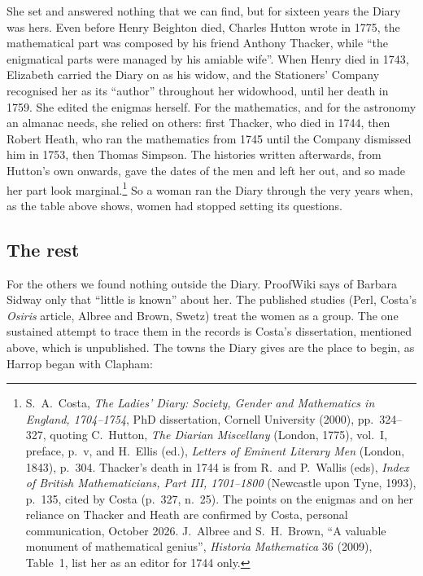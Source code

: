 \documentclass[11pt,a4paper]{article}
\begin{document}
She set and answered nothing that we can find, but for sixteen years the Diary was hers.
Even before Henry Beighton died, Charles Hutton wrote in 1775, the mathematical part was
composed by his friend Anthony Thacker, while ``the enigmatical parts were managed by his
amiable wife''. When Henry died in 1743, Elizabeth carried the Diary on as his widow, and
the Stationers' Company recognised her as its ``author'' throughout her widowhood, until
her death in 1759. She edited the enigmas herself. For the mathematics, and for the
astronomy an almanac needs, she relied on others: first Thacker, who died in 1744, then
Robert Heath, who
ran the mathematics from 1745 until the Company dismissed him in 1753, then Thomas
Simpson. The histories written afterwards, from Hutton's own onwards, gave the dates of
the men and left her out, and so made her part look marginal.\footnote{S.~A.~Costa,
\textit{The Ladies' Diary: Society, Gender and Mathematics in England, 1704--1754}, PhD
dissertation, Cornell University (2000), pp.~324--327, quoting C.~Hutton, \textit{The
Diarian Miscellany} (London, 1775), vol.~I, preface, p.~v, and H.~Ellis (ed.),
\textit{Letters of Eminent Literary Men} (London, 1843), p.~304. Thacker's death in 1744 is from R.~and P.~Wallis (eds), \textit{Index of British
Mathematicians, Part III, 1701--1800} (Newcastle upon Tyne, 1993), p.~135, cited by Costa
(p.~327, n.~25). The points on the
enigmas and on her reliance on Thacker and Heath are confirmed by Costa, personal
communication, October 2026. J.~Albree and S.~H.~Brown, ``A valuable monument of mathematical genius'', \textit{Historia Mathematica} 36 (2009), Table~1, list her as an editor for 1744 only.}
So a woman ran the Diary through the very years when, as the table above shows, women had
stopped setting its questions.

\subsection*{The rest}

For the others we found nothing outside the Diary. ProofWiki says of Barbara Sidway
only that ``little is known'' about her. The published studies (Perl, Costa's \textit{Osiris} article, Albree and
Brown, Swetz) treat the women as a group. The one sustained attempt to trace them in
the records is Costa's dissertation, mentioned above, which is unpublished.
The towns the Diary gives are the place to begin, as Harrop began with Clapham:
\end{document}

